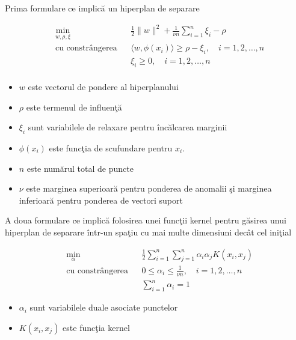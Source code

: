 Prima formulare ce implică un hiperplan de separare

\begin{equation}
    \begin{aligned}
    & \underset{w, \rho, \xi}{\text{min}}
    & & \frac{1}{2} \|w\|^2 + \frac{1}{\nu n} \sum_{i=1}^{n} \xi_i - \rho \\
    & \text{cu constrângerea}
    & & \langle w, \phi(x_i) \rangle \geq \rho - \xi_i, \quad i=1,2,\ldots,n \\
    &&& \xi_i \geq 0, \quad i=1,2,\ldots,n \\
    \end{aligned}
    \end{equation}
    
    \begin{itemize}
        \item $w$ este vectorul de pondere al hiperplanului
        \item $\rho$ este termenul de influenţă
        \item $\xi_i$ sunt variabilele de relaxare pentru încălcarea marginii
        \item $\phi(x_i)$ este funcţia de scufundare pentru $x_i$.
        \item $n$ este numărul total de puncte
        \item $\nu$ este marginea superioară pentru ponderea de anomalii şi marginea 
        inferioară pentru ponderea de vectori suport
    
    \end{itemize}


    A doua formulare ce implică folosirea unei funcţii kernel pentru găsirea unui hiperplan 
    de separare într-un spaţiu cu mai multe dimensiuni decât cel iniţial


    \begin{equation}
        \begin{aligned}
        & \underset{\alpha}{\text{min}}
        & & \frac{1}{2} \sum_{i=1}^{n} \sum_{j=1}^{n} \alpha_i \alpha_j K(x_i, x_j) \\
        & \text{cu constrângerea}
        & & 0 \leq \alpha_i \leq \frac{1}{\nu n}, \quad i=1,2,\ldots,n \\
        &&& \sum_{i=1}^{n} \alpha_i = 1
        \end{aligned}
        \end{equation}
    
    \begin{itemize}
        \item $\alpha_i$ sunt variabilele duale asociate punctelor 
        \item $K(x_i, x_j)$ este funcţia kernel
    \end{itemize}

